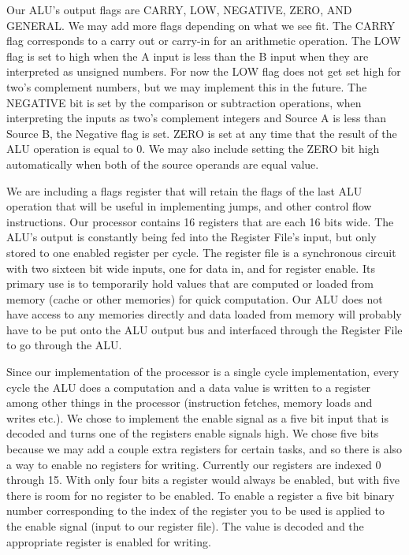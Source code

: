 \documentclass[onecolumn, 12pt]{IEEEtran}
\begin{document}
\par
Our ALU's output flags are CARRY, LOW, NEGATIVE, ZERO, AND GENERAL. We may add more flags depending on what we see fit. The CARRY flag corresponds to a carry out or carry-in for an arithmetic operation. The LOW flag is set to high when the A input is less than the B input when they are interpreted as unsigned numbers. For now the LOW flag does not get set high for two's complement numbers, but we may implement this in the future. The NEGATIVE bit is set by the comparison or subtraction operations, when interpreting the inputs as two's complement integers and Source A is less than Source B, the Negative flag is set. ZERO is set at any time that the result of the ALU operation is equal to 0. We may also include setting the ZERO bit high automatically when both of the source operands are equal value.
\par
We are including a flags register that will retain the flags of the last ALU operation that will be useful in implementing jumps, and other control flow instructions.
Our processor contains 16 registers that are each 16 bits wide.  The ALU's output is constantly being fed into the Register File's input, but only stored to one enabled register per cycle. The register file is a synchronous circuit with two sixteen bit wide inputs, one for data in, and for register enable. Its primary use is to temporarily hold values that are computed or loaded from memory (cache or other memories) for quick computation. Our ALU does not have access to any memories directly and data loaded from memory will probably have to be put onto the ALU output bus and interfaced through the Register File to go through the ALU.
\par
Since our implementation of the processor is a single cycle implementation, every cycle the ALU does a computation and a data value is written to a register among other things in the processor (instruction fetches, memory loads and writes etc.). We chose to implement the enable signal as a five bit input that is decoded and turns one of the registers enable signals high. We chose five bits because we may add a couple extra registers for certain tasks, and so there is also a way to enable no registers for writing. Currently our registers are indexed 0 through 15. With only four bits a register would always be enabled, but with five there is room for no register to be enabled. To enable a register a five bit binary number corresponding to the index of the register you to be used is applied to the enable signal (input to our register file). The value is decoded and the appropriate register is enabled for writing.
\end{document}
